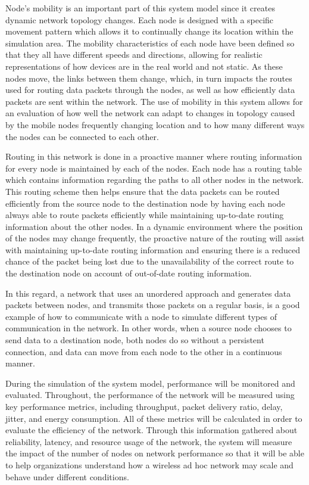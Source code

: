 \documentclass[a4paper,fleqn]{cas-dc}
\numberwithin{equation}{section}
\begin{document}
Node's mobility is an important part of this system model since it creates dynamic network topology changes. Each node is designed with a specific movement pattern which allows it to continually change its location within the simulation area. The mobility characteristics of each node have been defined so that they all have different speeds and directions, allowing for realistic representations of how devices are in the real world and not static. As these nodes move, the links between them change, which, in turn impacts the routes used for routing data packets through the nodes, as well as how efficiently data packets are sent within the network. The use of mobility in this system allows for an evaluation of how well the network can adapt to changes in topology caused by the mobile nodes frequently changing location and to how many different ways the nodes can be connected to each other.

Routing in this network is done in a proactive manner where routing information for every node is maintained by each of the nodes. Each node has a routing table which contains information regarding the paths to all other nodes in the network. This routing scheme then helps ensure that the data packets can be routed efficiently from the source node to the destination node by having each node always able to route packets efficiently while maintaining up-to-date routing information about the other nodes. In a dynamic environment where the position of the nodes may change frequently, the proactive nature of the routing will assist with maintaining up-to-date routing information and ensuring there is a reduced chance of the packet being lost due to the unavailability of the correct route to the destination node on account of out-of-date routing information.

In this regard, a network that uses an unordered approach and generates data packets between nodes, and transmits those packets on a regular basis, is a good example of how to communicate with a node to simulate different types of communication in the network. In other words, when a source node chooses to send data to a destination node, both nodes do so without a persistent connection, and data can move from each node to the other in a continuous manner.

During the simulation of the system model, performance will be monitored and evaluated. Throughout, the performance of the network will be measured using key performance metrics, including throughput, packet delivery ratio, delay, jitter, and energy consumption. All of these metrics will be calculated in order to evaluate the efficiency of the network. Through this information gathered about reliability, latency, and resource usage of the network, the system will measure the impact of the number of nodes on network performance so that it will be able to help organizations understand how a wireless ad hoc network may scale and behave under different conditions.
\end{document}
